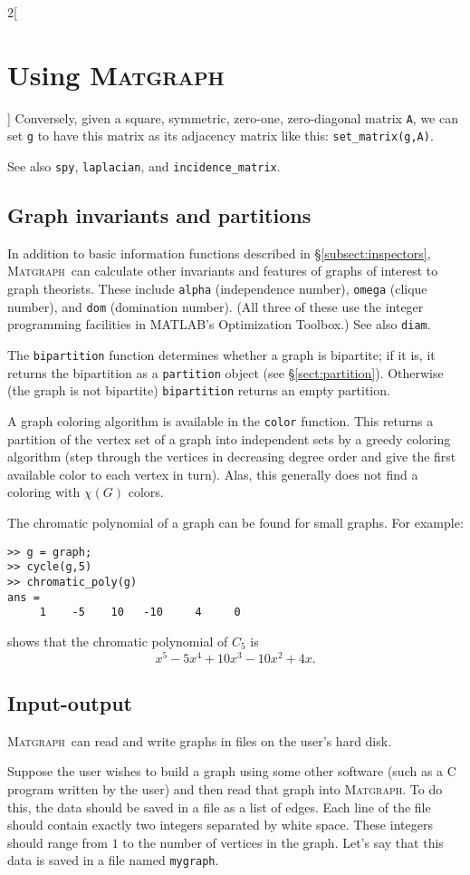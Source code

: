 \documentclass{amsart}
\newcommand\matlab{MATLAB}
\newcommand\matgraph{\textsc{Matgraph}}
\begin{document}
\begin{multicols}{2}[\section{Using \matgraph}]
Conversely, given a square, symmetric, zero-one, zero-diagonal matrix
\verb|A|, we can set \verb|g| to have this matrix as its adjacency
matrix like this: \verb|set_matrix(g,A)|. 

See also \verb|spy|, \verb|laplacian|, and \verb|incidence_matrix|. 


\subsection{Graph invariants and partitions}
\label{subsect:invariants}

In addition to basic information functions described in
\S\ref{subsect:inspectors}, \matgraph\ can calculate other invariants
and features of graphs of interest to graph theorists. These include
\verb|alpha| (independence number), \verb|omega| (clique number), and
\verb|dom| (domination number). (All three of these use the integer
programming facilities in \matlab's Optimization Toolbox.)
See also \verb|diam|. 

The \verb|bipartition| function determines whether a graph is
bipartite;  if it is, it returns the bipartition as a \verb|partition|
object (see \S\ref{sect:partition}). Otherwise (the graph is not
bipartite) \verb|bipartition| returns an empty partition.

A graph coloring algorithm is available in the \verb|color| function.
This returns a partition of the vertex set of a graph into independent
sets by a greedy coloring algorithm (step through the vertices in
decreasing degree order and give the first available color to each
vertex in turn). Alas, this generally does not find a coloring with
$\chi(G)$ colors. 

The chromatic polynomial of a graph can be found for small
graphs. For example:
\begin{verbatim}
>> g = graph;
>> cycle(g,5)
>> chromatic_poly(g)
ans =
     1    -5    10   -10     4     0
\end{verbatim}
shows that the chromatic polynomial of $C_5$ is
$$x^5-5x^4+10x^3-10x^2+4x.$$



\subsection{Input-output}
\label{subsect:io}

\matgraph\ can read and write graphs in files on the user's hard
disk. 

Suppose the user wishes to build a graph using some other software
(such as a C program written by the user) and then read that graph
into \matgraph. To do this, the data should be saved in a file as a
list of edges. Each line of the file should contain exactly two
integers separated by white space. These integers should range from
$1$ to the number of vertices in the graph.
Let's say that this data is saved in a file named \verb|mygraph|. 


\end{multicols}
\end{document}
